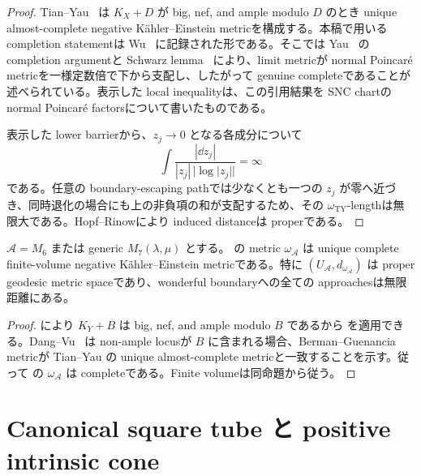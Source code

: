 \documentclass[11pt,a4paper]{ltjsarticle}
\newcommand{\cA}{\mathcal A}\newcommand{\cB}{\mathcal B}\newcommand{\cC}{\mathcal C}
\theoremstyle{plain}
\theoremstyle{definition}
\theoremstyle{remark}
\begin{document}
\begin{proof}
Tian--Yau~\cite{TY} は $K_X+D$ が big, nef, and ample modulo $D$ のとき unique almost-complete negative K\"ahler--Einstein metricを構成する。本稿で用いる completion statementは Wu~\cite[Introduction, pp.~395--397]{Wu08} に記録された形である。そこでは Yau~\cite[p.~474]{Yau93} の completion argumentと Schwarz lemma~\cite{YauSchwarz} により、limit metricが normal Poincar\'e metricを一様定数倍で下から支配し、したがって genuine completeであることが述べられている。表示した local inequalityは、この引用結果を SNC chartの normal Poincar\'e factorsについて書いたものである。

表示した lower barrierから、$z_j\to0$ となる各成分について
\[
 \int \frac{|\dd z_j|}{|z_j|\,|\log|z_j||}=\infty
\]
である。任意の boundary-escaping pathでは少なくとも一つの $z_j$ が零へ近づき、同時退化の場合にも上の非負項の和が支配するため、その $\omega_{\mathrm{TY}}$-lengthは無限大である。Hopf--Rinowにより induced distanceは properである。
\end{proof}

\begin{corollary}\label{cor:actual-completeness}
$\cA=M_6$ または generic $M_7(\lambda,\mu)$ とする。 の metric $\omega_{\cA}$ は unique complete finite-volume negative K\"ahler--Einstein metricである。特に $(U_{\cA},d_{\omega_{\cA}})$ は proper geodesic metric spaceであり、wonderful boundaryへの全ての approachesは無限距離にある。
\end{corollary}

\begin{proof}
 により $K_Y+B$ は big, nef, and ample modulo $B$ であるから  を適用できる。Dang--Vu~\cite[Theorem~1.1]{DangVu} は non-ample locusが $B$ に含まれる場合、Berman--Guenancia metricが Tian--Yau の unique almost-complete metricと一致することを示す。従って  の $\omega_{\cA}$ は completeである。Finite volumeは同命題から従う。
\end{proof}

\section{Canonical square tube と positive intrinsic cone}\label{sec:square-model}
\end{document}

